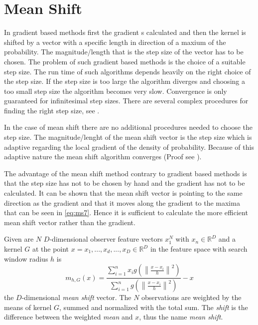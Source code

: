 \section{Mean Shift} %
\label{sec:mean_shift}
In gradient based methods first the gradient s calculated and then the kernel is
shifted by a vector with a specific length in direction of a maxium of the 
probability. The magnitude/length that is the step size of the vector has to be
chosen. The problem of such gradient based methods is the choice of a suitable
step size. The run time of such algorithms depends heavily on the right choice
of the step size. If the step size is too large the algorithm diverges and 
choosing a too small step size the algorithm becomes very slow. Convergence is
only guaranteed for infinitesimal step sizes. There are several complex 
procedures for finding the right step size, see \citeauthor{citeulike:462300} 
\citep{citeulike:462300}.

In the case of mean shift there are no additional procedures needed to choose
the step size. The magnitude/lenght of the mean shift vector is the step size 
which is adaptive regarding the local gradient of the density of probability. 
Because of this adaptive nature the mean shift algorithm converges (Proof see 
\citeauthor{citeulike:462300} \citep{citeulike:462300}).

The advantage of the mean shift method contrary to gradient based methods is
that the step size has not to be chosen by hand and the gradient has not to be
calculated. It can be shown that the mean shift vector is pointing to the same
direction as the gradient and that it moves along the gradient to the maxima 
that can be seen in \autoref{eq:ms7}. Hence it is sufficient to calculate the
more efficient mean shift vector rather than the gradient. 

Given are $N$ $D$-dimensional observer feature vectors $x_1^N$ with $x_n \in
\mathbb{R}^D$ and a kernel $G$ at the point
$x = {x_1, ... , x_d, ... , x_D} \in \mathbb{R}^D$ in the feature space with 
search window radius $h$ is 
\begin{equation}\label{eq:ms0}
	m_{h,G}(x) = \frac{\sum_{i=1}^n x_i g\left(\left\lVert \frac{x - x_i}{h}
	\right\rVert^2\right)}{\sum_{i=1}^n g\left(\left\lVert \frac{x - x_i}{h}
	\right\rVert^2\right)} -x
\end{equation}
the $D$-dimensional \textit{mean shift} vector. The $N$ observations are
weighted by the means of kernel $G$, summed and normalized with the total sum.
The \emph{shift} is the difference between the weighted \emph{mean} and $x$, thus
the name \emph{mean shift}. 

